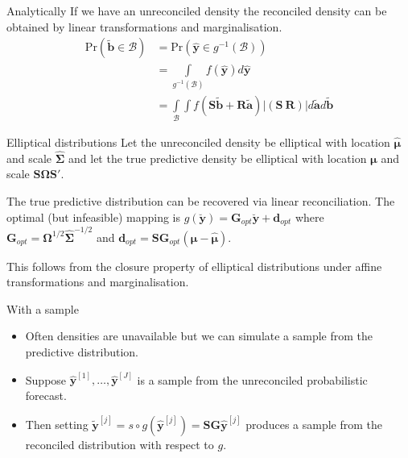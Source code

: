 \documentclass{beamer}
\begin{document}
  \begin{frame}{Analytically}
  	If we have an unreconciled density the reconciled density can be obtained by linear transformations and marginalisation.
  	\begin{align*}
  	\mbox{Pr}(\tilde{\bm{b}}\in \mathcal{B})&=\mbox{Pr}(\hat{\bm{y}}\in g^{-1}(\mathcal{B}))\\
  	&=\int\limits_{g^{-1}(\mathcal{B})}f(\hat{\bm{y}})d\hat{\bm{y}}\\
  	&=\int\limits_{\mathcal{B}}\int f(\bm{S}\tilde{\bm{b}}+\bm{R}\tilde{\bm{a}})|\left(\bm{S}~\bm{R}\right)|d\tilde{\bm{a}}d\tilde{\bm{b}}
  	\end{align*}
  \end{frame}
  \begin{frame}{Elliptical distributions}
  	Let the unreconciled density be elliptical with location  $\hat{\bm{\mu}}$ and scale $\hat{\bm{\Sigma}}$ and let the true predictive density be elliptical with location  ${\bm{\mu}}$ and scale ${\bm{S}}{\bm{\Omega}}{\bm{S}}'$.
  	\begin{theorem}
  		The true predictive distribution can be recovered via linear reconciliation.  The optimal (but infeasible) mapping is $g(\breve{\bm y})={\bm G}_{opt}\breve{\bm y}+{\bm d}_{opt}$ where $\bm{G}_{opt}={\bm\Omega}^{1/2}{\hat{\bm{\Sigma}}}^{-1/2}$ and ${\bm d}_{opt}={\bm S}{\bm G}_{opt}\left({\bm \mu}-\hat{\bm \mu}\right)$.
  	\end{theorem}
    This follows from the closure property of elliptical distributions under affine transformations and marginalisation.
  \end{frame}
  \begin{frame}{With a sample}
  	\begin{itemize}
  		\item Often densities are unavailable but we can simulate a sample from the predictive distribution.
  		\item Suppose $\bm{\hat{y}}^{[1]},\ldots,\bm{\hat{y}}^{[J]}$ is a sample from the unreconciled probabilistic forecast.
  		\item Then setting $\tilde{\bm y}^{[j]}=s\circ g(\hat{\bm y}^{[j]})=\bm{S}\bm{G}\hat{\bm y}^{[j]}$ produces a sample from the reconciled distribution with respect to $g$.
  	\end{itemize}
  \end{frame}
\end{document}
